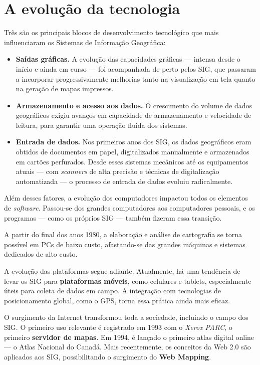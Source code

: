 \section{A evolução da tecnologia}

Três são os principais blocos de desenvolvimento tecnológico que mais influenciaram os Sistemas de Informação Geográfica:

\begin{itemize}
 \item \textbf{Saídas gráficas.} A evolução das capacidades gráficas — intensa desde o início e ainda em curso — foi acompanhada de perto pelos SIG, que passaram a incorporar progressivamente melhorias tanto na visualização em tela quanto na geração de mapas impressos.

 \item \textbf{Armazenamento e acesso aos dados.} O crescimento do volume de dados geográficos exigiu avanços em capacidade de armazenamento e velocidade de leitura, para garantir uma operação fluida dos sistemas.

 \item \textbf{Entrada de dados.} Nos primeiros anos dos SIG, os dados geográficos eram obtidos de documentos em papel, digitalizados manualmente e armazenados em cartões perfurados. Desde esses sistemas mecânicos até os equipamentos atuais — com \emph{scanners} de alta precisão e técnicas de digitalização automatizada — o processo de entrada de dados evoluiu radicalmente.
\end{itemize}

Além desses fatores, a evolução dos computadores impactou todos os elementos de \emph{software}. Passou-se dos grandes computadores aos computadores pessoais, e os programas — como os próprios SIG — também fizeram essa transição.

A partir do final dos anos 1980, a elaboração e análise de cartografia se torna possível em PCs de baixo custo, afastando-se das grandes máquinas e sistemas dedicados de alto custo.

A evolução das plataformas segue adiante. Atualmente, há uma tendência de levar os SIG para \textbf{plataformas móveis}, como celulares e tablets, especialmente úteis para coleta de dados em campo. A integração com tecnologias de posicionamento global, como o GPS, torna essa prática ainda mais eficaz.

O surgimento da Internet transformou toda a sociedade, incluindo o campo dos SIG. O primeiro uso relevante é registrado em 1993 com o \emph{Xerox PARC}, o primeiro \textbf{servidor de mapas}. Em 1994, é lançado o primeiro atlas digital online — o Atlas Nacional do Canadá. Mais recentemente, os conceitos da Web 2.0 são aplicados aos SIG, possibilitando o surgimento do \textbf{Web Mapping}.

